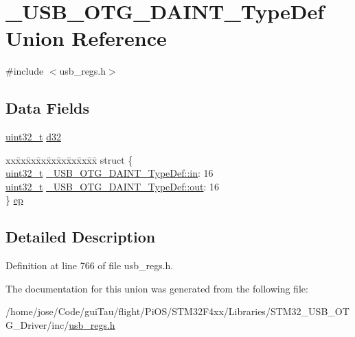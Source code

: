 \hypertarget{union___u_s_b___o_t_g___d_a_i_n_t___type_def}{\section{\-\_\-\-U\-S\-B\-\_\-\-O\-T\-G\-\_\-\-D\-A\-I\-N\-T\-\_\-\-Type\-Def Union Reference}
\label{union___u_s_b___o_t_g___d_a_i_n_t___type_def}
}


{\ttfamily \#include $<$usb\-\_\-regs.\-h$>$}

\subsection*{Data Fields}
\begin{DoxyCompactItemize}
\item 
\hyperlink{stdint_8h_a435d1572bf3f880d55459d9805097f62}{uint32\-\_\-t} \hyperlink{group___u_s_b___o_t_g___d_r_i_v_e_r_gad342406e081a08b2f1ef61a8144b732e}{d32}
\item 
\begin{tabbing}
xx\=xx\=xx\=xx\=xx\=xx\=xx\=xx\=xx\=\kill
struct \{\\
\>\hyperlink{stdint_8h_a435d1572bf3f880d55459d9805097f62}{uint32\_t} \hyperlink{group___u_s_b___o_t_g___d_r_i_v_e_r_ga95218036397e28b27ccde01eaf9bd063}{\_USB\_OTG\_DAINT\_TypeDef::in}: 16\\
\>\hyperlink{stdint_8h_a435d1572bf3f880d55459d9805097f62}{uint32\_t} \hyperlink{group___u_s_b___o_t_g___d_r_i_v_e_r_ga60a84be2a00058a3ed7c410e909322af}{\_USB\_OTG\_DAINT\_TypeDef::out}: 16\\
\} \hyperlink{group___u_s_b___o_t_g___d_r_i_v_e_r_ga28342af4664393bab0bcdbfcd15ac1c4}{ep}\\

\end{tabbing}\end{DoxyCompactItemize}


\subsection{Detailed Description}


Definition at line 766 of file usb\-\_\-regs.\-h.



The documentation for this union was generated from the following file\-:\begin{DoxyCompactItemize}
\item 
/home/jose/\-Code/gui\-Tau/flight/\-Pi\-O\-S/\-S\-T\-M32\-F4xx/\-Libraries/\-S\-T\-M32\-\_\-\-U\-S\-B\-\_\-\-O\-T\-G\-\_\-\-Driver/inc/\hyperlink{_s_t_m32_f4xx_2_libraries_2_s_t_m32___u_s_b___o_t_g___driver_2inc_2usb__regs_8h}{usb\-\_\-regs.\-h}\end{DoxyCompactItemize}
